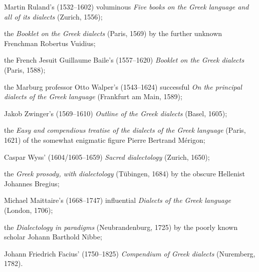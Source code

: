 \begin{listWWNumileveli}
\item 
\begin{styleListParagraph}
Martin Ruland’s (1532–1602) voluminous \textit{Five books on the Greek language and all of its dialects} (Zurich, 1556);
\end{styleListParagraph}
\item 
\begin{styleListParagraph}
the \textit{Booklet on the Greek dialects} (Paris, 1569) by the further unknown Frenchman Robertus Vuidius;
\end{styleListParagraph}
\item 
\begin{styleListParagraph}
the French Jesuit Guillaume Baile’s (1557–1620) \textit{Booklet on the Greek dialects} (Paris, 1588);
\end{styleListParagraph}
\item 
\begin{styleListParagraph}
the Marburg professor Otto Walper’s (1543–1624) successful \textit{On the principal dialects of the Greek language} (Frankfurt am Main, 1589);
\end{styleListParagraph}
\item 
\begin{styleListParagraph}
Jakob Zwinger’s (1569–1610) \textit{Outline of the Greek dialects} (Basel, 1605);
\end{styleListParagraph}
\item 
\begin{styleListParagraph}
the \textit{Easy and compendious treatise of the dialects of the Greek language} (Paris, 1621) of the somewhat enigmatic figure Pierre Bertrand Mérigon;
\end{styleListParagraph}
\item 
\begin{styleListParagraph}
Caspar Wyss’ (1604/1605–1659) \textit{Sacred dialectology} (Zurich, 1650);
\end{styleListParagraph}
\item 
\begin{styleListParagraph}
the \textit{Greek prosody, with dialectology} (Tübingen, 1684) by the obscure Hellenist Johannes Bregius;
\end{styleListParagraph}
\item 
\begin{styleListParagraph}
Michael Maittaire’s (1668–1747) influential \textit{Dialects of the Greek language} (London, 1706);
\end{styleListParagraph}
\item 
\begin{styleListParagraph}
the\textit{ Dialectology in paradigms} (Neubrandenburg, 1725) by the poorly known scholar Johann Barthold Nibbe;
\end{styleListParagraph}
\item 
\begin{styleListParagraph}
Johann Friedrich Facius’ (1750–1825) \textit{Compendium of Greek dialects} (Nuremberg, 1782).
\end{styleListParagraph}
\end{listWWNumileveli}
